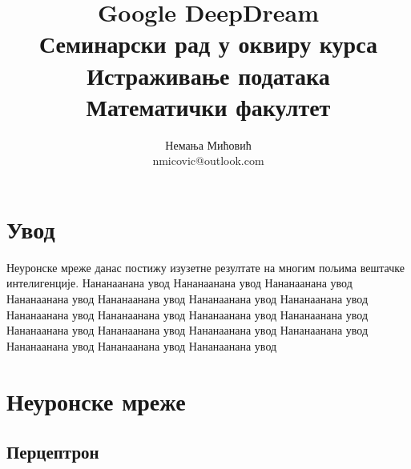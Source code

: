\documentclass[a4paper]{article}
\begin{document}
\title{Google DeepDream \\ \small{Семинарски рад у оквиру курса\\Истраживање података\\ Математички факултет}}

\author{Немања Мићовић\\ nmicovic@outlook.com}
\date{}
\maketitle


\tableofcontents

\newpage

\section{Увод}
Неуронске мреже данас постижу изузетне резултате на многим пољима вештачке интелигенције.
Нананаанана увод Нананаанана увод Нананаанана увод
Нананаанана увод Нананаанана увод Нананаанана увод
Нананаанана увод Нананаанана увод Нананаанана увод
Нананаанана увод Нананаанана увод Нананаанана увод
Нананаанана увод Нананаанана увод Нананаанана увод
Нананаанана увод Нананаанана увод Нананаанана увод

\section{Неуронске мреже}

\subsection{Перцептрон}
\end{document}
